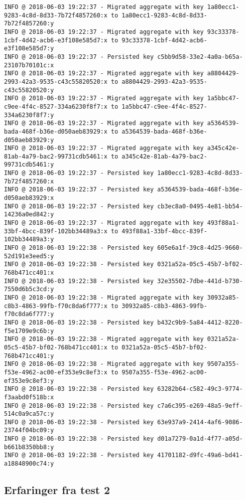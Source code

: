 \begin{lstlisting}[basicstyle=\small, label={testlog}, caption={De første 50 linjene i den applikasjonsloggen til tjeneren ''vbb-master2018-crabbe''' (se tabell \ref{droplets}) fra test 2.}]
INFO @ 2018-06-03 19:22:37 - Migrated aggregate with key 1a80ecc1-9283-4c8d-8d33-7b72f4857260:x to 1a80ecc1-9283-4c8d-8d33-7b72f4857260:y
INFO @ 2018-06-03 19:22:37 - Migrated aggregate with key 93c33378-1cbf-4d42-acb6-e3f108e585d7:x to 93c33378-1cbf-4d42-acb6-e3f108e585d7:y
INFO @ 2018-06-03 19:22:37 - Persisted key c5bb9d58-33e2-4a0a-b65a-23107b70101c:x
INFO @ 2018-06-03 19:22:37 - Migrated aggregate with key a8804429-2993-42a3-9535-c43c55820520:x to a8804429-2993-42a3-9535-c43c55820520:y
INFO @ 2018-06-03 19:22:37 - Migrated aggregate with key 1a5bbc47-c9ee-4f4c-8527-334a6230f8f7:x to 1a5bbc47-c9ee-4f4c-8527-334a6230f8f7:y
INFO @ 2018-06-03 19:22:37 - Migrated aggregate with key a5364539-bada-468f-b36e-d050aeb83929:x to a5364539-bada-468f-b36e-d050aeb83929:y
INFO @ 2018-06-03 19:22:37 - Migrated aggregate with key a345c42e-81ab-4a79-bac2-99731cdb5461:x to a345c42e-81ab-4a79-bac2-99731cdb5461:y
INFO @ 2018-06-03 19:22:37 - Persisted key 1a80ecc1-9283-4c8d-8d33-7b72f4857260:x
INFO @ 2018-06-03 19:22:37 - Persisted key a5364539-bada-468f-b36e-d050aeb83929:x
INFO @ 2018-06-03 19:22:37 - Persisted key cb3ec8a0-0495-4e81-bb54-14236a0ed842:y
INFO @ 2018-06-03 19:22:37 - Migrated aggregate with key 493f88a1-33bf-4bcc-839f-102bb34489a3:x to 493f88a1-33bf-4bcc-839f-102bb34489a3:y
INFO @ 2018-06-03 19:22:38 - Persisted key 605e6a1f-39c8-4d25-9660-52d191e3eed5:y
INFO @ 2018-06-03 19:22:38 - Persisted key 0321a52a-05c5-45b7-bf02-768b471cc401:x
INFO @ 2018-06-03 19:22:38 - Persisted key 32e35502-7dbe-441d-b730-7550d6b5c3cd:y
INFO @ 2018-06-03 19:22:38 - Migrated aggregate with key 30932a85-c8b3-4863-99fb-f70c8da6f777:x to 30932a85-c8b3-4863-99fb-f70c8da6f777:y
INFO @ 2018-06-03 19:22:38 - Persisted key b432c9b9-5a84-4412-8220-f5e1709e9c6b:y
INFO @ 2018-06-03 19:22:38 - Migrated aggregate with key 0321a52a-05c5-45b7-bf02-768b471cc401:x to 0321a52a-05c5-45b7-bf02-768b471cc401:y
INFO @ 2018-06-03 19:22:38 - Migrated aggregate with key 9507a355-f53e-4962-ac00-ef353e9c8ef3:x to 9507a355-f53e-4962-ac00-ef353e9c8ef3:y
INFO @ 2018-06-03 19:22:38 - Persisted key 63282b64-c582-49c3-9774-f3aabd0f518b:x
INFO @ 2018-06-03 19:22:38 - Persisted key c7a6c395-e269-48a5-9eff-514c0a9ca57c:y
INFO @ 2018-06-03 19:22:38 - Persisted key 63e937a9-2414-4af6-9086-23744f04bc09:y
INFO @ 2018-06-03 19:22:38 - Persisted key d01a7279-0a1d-4f77-a05d-b661b8350bb8:y
INFO @ 2018-06-03 19:22:38 - Persisted key 41701182-d9fc-49a6-bd41-a18848900c74:y
\end{lstlisting}

\subsection{Erfaringer fra test 2}

